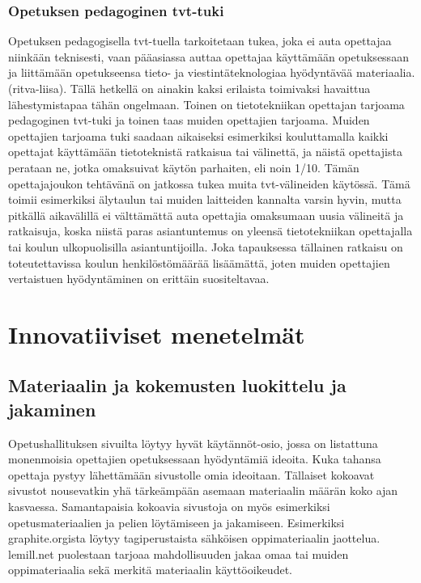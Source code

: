 \documentclass[utf8,bachelor]{gradu3}
\begin{document}
\subsection{Opetuksen pedagoginen tvt-tuki}
Opetuksen pedagogisella tvt-tuella tarkoitetaan tukea, joka ei auta opettajaa niinkään teknisesti, vaan pääasiassa auttaa opettajaa käyttämään opetuksessaan ja liittämään opetukseensa tieto- ja viestintäteknologiaa hyödyntävää materiaalia. (ritva-liisa). Tällä hetkellä on ainakin kaksi erilaista toimivaksi havaittua lähestymistapaa tähän ongelmaan. Toinen on tietotekniikan opettajan tarjoama pedagoginen tvt-tuki ja toinen taas muiden opettajien tarjoama. Muiden opettajien tarjoama tuki saadaan aikaiseksi esimerkiksi kouluttamalla kaikki opettajat käyttämään tietoteknistä ratkaisua tai välinettä, ja näistä opettajista perataan ne, jotka omaksuivat käytön parhaiten, eli noin 1/10. Tämän opettajajoukon tehtävänä on jatkossa tukea muita tvt-välineiden käytössä. Tämä toimii esimerkiksi älytaulun tai muiden laitteiden kannalta varsin hyvin, mutta pitkällä aikavälillä ei välttämättä auta opettajia omaksumaan uusia välineitä ja ratkaisuja, koska niistä paras asiantuntemus on yleensä tietotekniikan opettajalla tai koulun ulkopuolisilla asiantuntijoilla. Joka tapauksessa tällainen ratkaisu on toteutettavissa koulun henkilöstömäärää lisäämättä, joten muiden opettajien vertaistuen hyödyntäminen on erittäin suositeltavaa.

\chapter{Innovatiiviset menetelmät}

\section{Materiaalin ja kokemusten luokittelu ja jakaminen}
Opetushallituksen sivuilta löytyy hyvät käytännöt-osio, jossa on listattuna monenmoisia opettajien opetuksessaan hyödyntämiä ideoita. \parencite[][]{hyvatkaytannot} Kuka tahansa opettaja pystyy lähettämään sivustolle omia ideoitaan. Tällaiset kokoavat sivustot nousevatkin yhä tärkeämpään asemaan materiaalin määrän koko ajan kasvaessa. Samantapaisia kokoavia sivustoja on myös esimerkiksi opetusmateriaalien ja pelien löytämiseen ja jakamiseen. Esimerkiksi graphite.orgista löytyy tagiperustaista sähköisen oppimateriaalin jaottelua. lemill.net puolestaan tarjoaa mahdollisuuden jakaa omaa tai muiden oppimateriaalia sekä merkitä materiaalin käyttöoikeudet.
\end{document}
